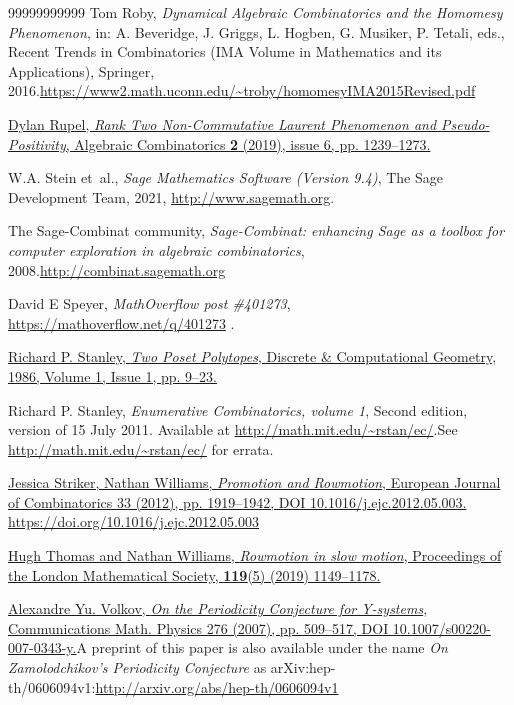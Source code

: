 \documentclass[numbers=enddot,12pt,final,onecolumn,notitlepage]{scrartcl}%
\theoremstyle{definition}
\begin{document}
\begin{thebibliography}{99999999999}
Tom Roby, \textit{Dynamical Algebraic Combinatorics
and the Homomesy Phenomenon}, in: A. Beveridge, J. Griggs, L. Hogben, G.
Musiker, P. Tetali, eds., Recent Trends in Combinatorics (IMA Volume in
Mathematics and its Applications), Springer, 2016.\newline\url{https://www2.math.uconn.edu/~troby/homomesyIMA2015Revised.pdf}

\href{https://doi.org/10.5802/alco.81}{Dylan Rupel,
\textit{Rank Two Non-Commutative Laurent Phenomenon and Pseudo-Positivity},
Algebraic Combinatorics \textbf{2} (2019), issue 6, pp. 1239--1273.}

W.\thinspace{}A. Stein et~al., \emph{{S}age
{M}athematics {S}oftware ({V}ersion 9.4)}, The Sage Development Team, 2021, \url{http://www.sagemath.org}.

The Sage-Combinat community,
\textit{Sage-Combinat: enhancing Sage as a toolbox for computer exploration in
algebraic combinatorics}, 2008.\newline\url{http://combinat.sagemath.org}

David E Speyer, \textit{MathOverflow post
\#401273}, \url{https://mathoverflow.net/q/401273} .

%
\href{https://math.mit.edu/~rstan/pubs/pubfiles/66.pdf}{Richard P. Stanley,
\textit{Two Poset Polytopes}, Discrete \& Computational Geometry, 1986, Volume
1, Issue 1, pp. 9--23.}

Richard P. Stanley, \textit{Enumerative
Combinatorics, volume 1}, Second edition, version of 15 July 2011. Available
at \url{http://math.mit.edu/~rstan/ec/}.\newline See
\url{http://math.mit.edu/~rstan/ec/} for errata.

%
\href{https://doi.org/10.1016/j.ejc.2012.05.003}{Jessica Striker, Nathan
Williams, \textit{Promotion and Rowmotion}, European Journal of Combinatorics
33 (2012), pp. 1919--1942, DOI 10.1016/j.ejc.2012.05.003.} \newline\url{https://doi.org/10.1016/j.ejc.2012.05.003}

\href{https://doi.org/10.1112/plms.12251}{Hugh
Thomas and Nathan Williams, \textit{Rowmotion in slow motion}, Proceedings of
the London Mathematical Society, \textbf{119}(5) (2019) 1149--1178.}

%
\href{https://doi.org/10.1007/s00220-007-0343-y}{Alexandre Yu. Volkov,
\textit{On the Periodicity Conjecture for Y-systems}, Communications Math.
Physics 276 (2007), pp. 509--517, DOI 10.1007/s00220-007-0343-y.}\newline A
preprint of this paper is also available under the name \textit{On
Zamolodchikov's Periodicity Conjecture} as arXiv:hep-th/0606094v1:\newline\url{http://arxiv.org/abs/hep-th/0606094v1}
\end{thebibliography}
\end{document}
